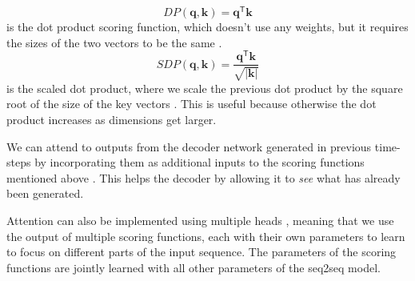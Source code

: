 \documentclass[12pt]{article}
\begin{document}
\begin{equation}
DP(\bm{q},\bm{k})=\bm{q}^\mathsf{T}\bm{k}
\end{equation}
is the dot product scoring function, which doesn't use any weights, but it requires the sizes of the two vectors to be the same \cite{Luong:2015}.
\begin{equation}
SDP(\bm{q},\bm{k})=\frac{\bm{q}^\mathsf{T}\bm{k}}{\sqrt{|\bm{k}|}}
\end{equation}
is the scaled dot product, where we scale the previous dot product by the square root of the size of the key vectors \cite{Vaswani:2017}. This is useful because otherwise the dot product increases as dimensions get larger.

We can attend to outputs from the decoder network generated in previous time-steps by incorporating them as additional inputs to the scoring functions mentioned above \cite{Shao:2017}. This helps the decoder by allowing it to \textit{see} what has already been generated.

Attention can also be implemented using multiple heads \cite{Vaswani:2017}, meaning that we use the output of multiple scoring functions, each with their own parameters to learn to focus on different parts of the input sequence. The parameters of the scoring functions are jointly learned with all other parameters of the seq2seq model.
\end{document}
